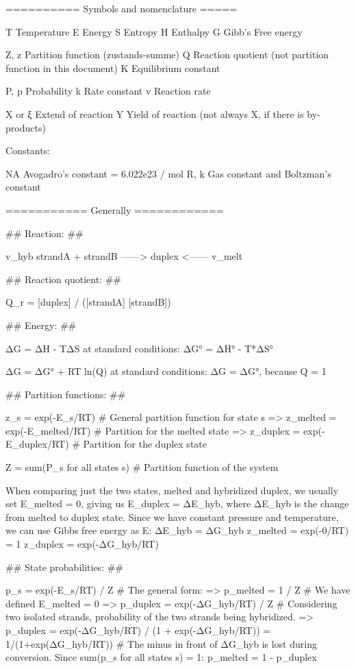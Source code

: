 


========== Symbols and nomenclature =====

    T       Temperature
    E       Energy
    S       Entropy
    H       Enthalpy
    G       Gibb's Free energy

    Z, z    Partition function (zustands-summe)
    Q       Reaction quotient (not partition function in this document)
    K       Equilibrium constant

    P, p    Probability
    k       Rate constant
    v       Reaction rate

    X or ξ  Extend of reaction
    Y       Yield of reaction (not always X, if there is by-products)


Constants:

    NA      Avogadro's constant = 6.022e23 / mol
    R, k    Gas constant and Boltzman's constant


=========== Generally ============

## Reaction: ##

                        v_hyb
    strandA + strandB   ------>  duplex
                       <------
                        v_melt

## Reaction quotient: ##

    Q_r = [duplex] / ([strandA] [strandB])


## Energy: ##

    ΔG = ΔH - TΔS           at standard conditions: ΔG° = ΔH° - T*ΔS°

    ΔG = ΔG° + RT ln(Q)     at standard conditions: ΔG = ΔG°, because Q = 1


## Partition functions: ##

    z_s = exp(-E_s/RT)                  # General partition function for state s
    => z_melted = exp(-E_melted/RT)     # Partition for the melted state
    => z_duplex = exp(-E_duplex/RT)     # Partition for the duplex state

    Z = sum(P_s for all states s)        # Partition function of the system

    When comparing just the two states, melted and hybridized duplex, we usually set
    E_melted = 0, giving us E_duplex = ΔE_hyb, where ΔE_hyb is the change from melted to duplex state.
    Since we have constant pressure and temperature, we can use Gibbs free energy as E: ΔE_hyb = ΔG_hyb
        z_melted = exp(-0/RT) = 1
        z_duplex = exp(-ΔG_hyb/RT)


## State probabilities: ##

    p_s = exp(-E_s/RT) / Z              # The general form:
     => p_melted = 1 / Z                # We have defined E_melted = 0
     => p_duplex = exp(-ΔG_hyb/RT) / Z  # Considering two isolated strands, probability of the two strands being hybridized.
     => p_duplex = exp(-ΔG_hyb/RT) / (1 + exp(-ΔG_hyb/RT))
                = 1/(1+exp(ΔG_hyb/RT))  # The minus in front of ΔG_hyb is lost during conversion.
    Since sum(p_s for all states s) = 1:
        p_melted = 1 - p_duplex

